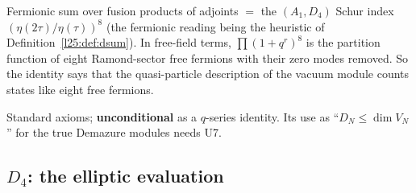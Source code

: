 \begin{physics}
Fermionic sum over fusion products of adjoints $=$ the $(A_1,D_4)$ Schur index $(\eta(2\tau)/\eta(\tau))^8$ (the fermionic
reading being the heuristic of Definition~\ref{l25:def:dsum}). In free-field terms, $\prod(1+q^r)^8$ is the partition
function of eight Ramond-sector free fermions with their zero modes removed. So the identity says that the
quasi-particle description of the vacuum module counts states like eight free fermions.
\end{physics}
\begin{status}
Standard axioms; \textbf{unconditional} as a $q$-series identity. Its use as ``$D_N\le\dim V_N$'' for the true
Demazure modules needs U7.
\end{status}

\subsection{\texorpdfstring{$D_4$}{D4}: the elliptic evaluation}

